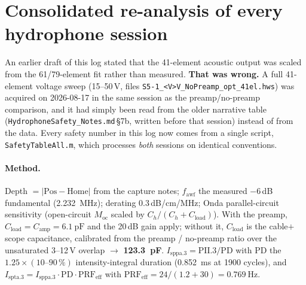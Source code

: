 \documentclass[11pt,a4paper]{article}
\newcommand{\bad}[1]{\textcolor{red!65!black}{\textbf{#1}}}
\begin{document}
\section{Consolidated re-analysis of every hydrophone session}\label{sec:safety}
An earlier draft of this log stated that the 41-element acoustic output was scaled from the
61/79-element fit rather than measured. \bad{That was wrong.} A full 41-element voltage sweep
(15--50\,V, files \texttt{S5-1\_<V>V\_NoPreamp\_opt\_41el.hws}) was acquired on 2026-08-17 in the
same session as the preamp/no-preamp comparison, and it had simply been read from the older
narrative table (\texttt{HydrophoneSafety\_Notes.md}\,\S7b, written before that session) instead of
from the data. Every safety number in this log now comes from a single script,
\texttt{SafetyTableAll.m}, which processes \emph{both} sessions on identical conventions.

\paragraph{Method.} Depth $=|\mathrm{Pos}-\mathrm{Home}|$ from the capture notes; $f_\mathrm{awf}$
the measured $-6$\,dB fundamental (\SI{2.232}{\mega\hertz}); derating 0.3\,dB/cm/MHz; Onda
parallel-circuit sensitivity (open-circuit $M_\mathrm{oc}$ scaled by $C_h/(C_h+C_\mathrm{load})$).
With the preamp, $C_\mathrm{load}=C_\mathrm{amp}=\SI{6.1}{\pico\farad}$ and the 20\,dB gain apply;
without it, $C_\mathrm{load}$ is the cable$+$scope capacitance, calibrated from the preamp /
no-preamp ratio over the unsaturated 3--12\,V overlap $\rightarrow$
\textbf{\SI{123.3}{\pico\farad}}. $I_\mathrm{sppa.3}=\mathrm{PII.3}/\mathrm{PD}$ with PD the
$1.25\times(10\text{--}90\,\%)$ intensity-integral duration (\SI{0.852}{\milli\second} at 1900
cycles), and $I_\mathrm{spta.3}=I_\mathrm{sppa.3}\cdot\mathrm{PD}\cdot\mathrm{PRF_{eff}}$ with
$\mathrm{PRF_{eff}}=24/(1.2+30)=\SI{0.769}{\hertz}$.
\end{document}
